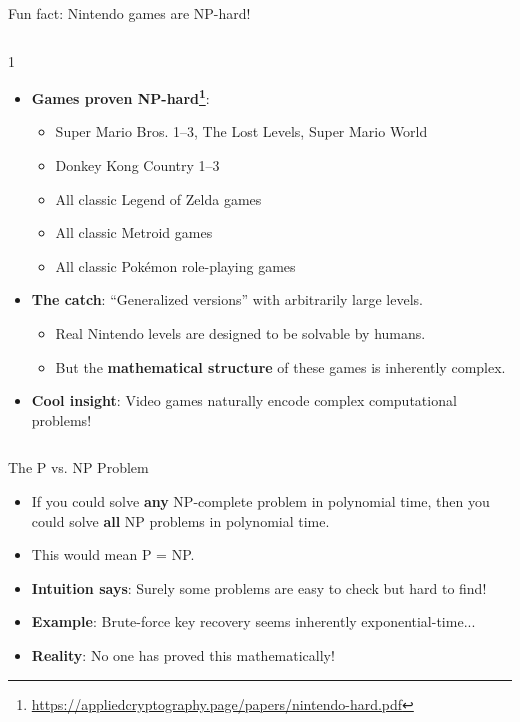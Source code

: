 \documentclass[aspectratio=169, lualatex, handout]{beamer}
\begin{document}
\begin{frame}{Fun fact: Nintendo games are NP-hard!}
	\begin{columns}[c]
		\begin{column}{1\textwidth}
			\begin{itemize}[<+->]
				\item \textbf{Games proven NP-hard\footnote{\url{https://appliedcryptography.page/papers/nintendo-hard.pdf}}}:
				      \begin{itemize}
					      \item Super Mario Bros. 1–3, The Lost Levels, Super Mario World
					      \item Donkey Kong Country 1–3
					      \item All classic Legend of Zelda games
					      \item All classic Metroid games
					      \item All classic Pokémon role-playing games
				      \end{itemize}
				\item \textbf{The catch}: ``Generalized versions'' with arbitrarily large levels.
				      \begin{itemize}
					      \item Real Nintendo levels are designed to be solvable by humans.
					      \item But the \textbf{mathematical structure} of these games is inherently complex.
				      \end{itemize}
				\item \textbf{Cool insight}: Video games naturally encode complex computational problems!
			\end{itemize}
		\end{column}
	\end{columns}
\end{frame}

\begin{frame}{The P vs. NP Problem}
	\begin{itemize}[<+->]
		\item If you could solve \textbf{any} NP-complete problem in polynomial time, then you could solve \textbf{all} NP problems in polynomial time.
		\item This would mean P = NP.
		\item \textbf{Intuition says}: Surely some problems are easy to check but hard to find!
		\item \textbf{Example}: Brute-force key recovery seems inherently exponential-time...
		\item \textbf{Reality}: No one has proved this mathematically!
	\end{itemize}
\end{frame}
\end{document}

